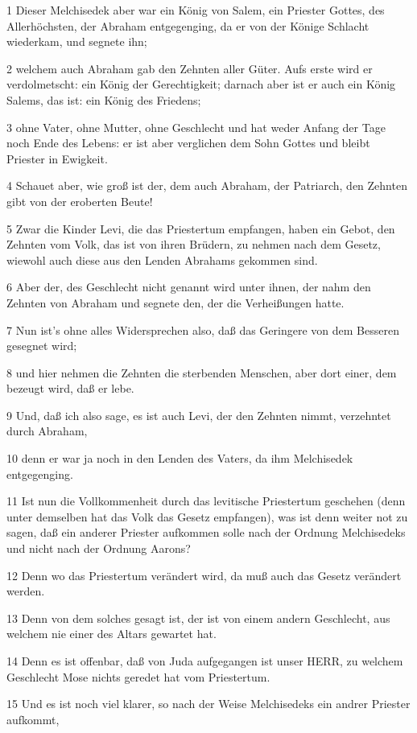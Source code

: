 \par 1 Dieser Melchisedek aber war ein König von Salem, ein Priester Gottes, des Allerhöchsten, der Abraham entgegenging, da er von der Könige Schlacht wiederkam, und segnete ihn;
\par 2 welchem auch Abraham gab den Zehnten aller Güter. Aufs erste wird er verdolmetscht: ein König der Gerechtigkeit; darnach aber ist er auch ein König Salems, das ist: ein König des Friedens;
\par 3 ohne Vater, ohne Mutter, ohne Geschlecht und hat weder Anfang der Tage noch Ende des Lebens: er ist aber verglichen dem Sohn Gottes und bleibt Priester in Ewigkeit.
\par 4 Schauet aber, wie groß ist der, dem auch Abraham, der Patriarch, den Zehnten gibt von der eroberten Beute!
\par 5 Zwar die Kinder Levi, die das Priestertum empfangen, haben ein Gebot, den Zehnten vom Volk, das ist von ihren Brüdern, zu nehmen nach dem Gesetz, wiewohl auch diese aus den Lenden Abrahams gekommen sind.
\par 6 Aber der, des Geschlecht nicht genannt wird unter ihnen, der nahm den Zehnten von Abraham und segnete den, der die Verheißungen hatte.
\par 7 Nun ist's ohne alles Widersprechen also, daß das Geringere von dem Besseren gesegnet wird;
\par 8 und hier nehmen die Zehnten die sterbenden Menschen, aber dort einer, dem bezeugt wird, daß er lebe.
\par 9 Und, daß ich also sage, es ist auch Levi, der den Zehnten nimmt, verzehntet durch Abraham,
\par 10 denn er war ja noch in den Lenden des Vaters, da ihm Melchisedek entgegenging.
\par 11 Ist nun die Vollkommenheit durch das levitische Priestertum geschehen (denn unter demselben hat das Volk das Gesetz empfangen), was ist denn weiter not zu sagen, daß ein anderer Priester aufkommen solle nach der Ordnung Melchisedeks und nicht nach der Ordnung Aarons?
\par 12 Denn wo das Priestertum verändert wird, da muß auch das Gesetz verändert werden.
\par 13 Denn von dem solches gesagt ist, der ist von einem andern Geschlecht, aus welchem nie einer des Altars gewartet hat.
\par 14 Denn es ist offenbar, daß von Juda aufgegangen ist unser HERR, zu welchem Geschlecht Mose nichts geredet hat vom Priestertum.
\par 15 Und es ist noch viel klarer, so nach der Weise Melchisedeks ein andrer Priester aufkommt,
